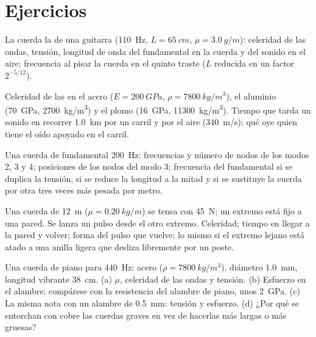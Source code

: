 \section{Ejercicios}

\begin{exercise}[$\star$]\label{exo:b2:waves-on-strings:1}
La cuerda la de una guitarra (\qty{110}{Hz}, $L = \qty{65}{cm}$, $\mu = \qty{3.0}{g/m}$):
celeridad de las ondas, tensión, longitud de onda del fundamental en la
cuerda y del sonido en el aire; frecuencia al pisar la cuerda en el quinto
traste ($L$ reducida en un factor $2^{-5/12}$).
\end{exercise}

\begin{exercise}[$\star$]\label{exo:b2:waves-on-strings:2}
Celeridad de las  en el acero ($E = \qty{200}{GPa}$, $\rho =
\qty{7800}{kg/m^3}$), el aluminio (\qty{70}{GPa}, \qty{2700}{kg/m^3}) y el plomo
(\qty{16}{GPa}, \qty{11300}{kg/m^3}). Tiempo que tarda un sonido en recorrer \qty{1.0}{km}
por un carril y por el aire (\qty{340}{m/s}); qué oye quien tiene el oído
apoyado en el carril.
\end{exercise}

\begin{exercise}[$\star$]\label{exo:b2:waves-on-strings:3}
Una cuerda de fundamental \qty{200}{Hz}: frecuencias y número de nodos de
los modos 2, 3 y 4; posiciones de los nodos del modo 3; frecuencia del
fundamental si se duplica la tensión, si se reduce la longitud a la mitad
y si se sustituye la cuerda por otra tres veces más pesada por metro.
\end{exercise}

\begin{exercise}[$\star$]\label{exo:b2:waves-on-strings:4}
Una cuerda de \qty{12}{m} ($\mu = \qty{0.20}{kg/m}$) se tensa con \qty{45}{N};
un extremo está fijo a una pared. Se lanza un pulso desde el otro extremo.
Celeridad; tiempo en llegar a la pared y volver; forma del pulso que
vuelve; lo mismo si el extremo lejano está atado a una anilla ligera que
desliza libremente por un poste.
\end{exercise}

\begin{exercise}[$\star\star$]\label{exo:b2:waves-on-strings:5}
Una cuerda de piano para \qty{440}{Hz}: acero ($\rho = \qty{7800}{kg/m^3}$),
diámetro \qty{1.0}{mm}, longitud vibrante \qty{38}{cm}. (a) $\mu$, celeridad
de las ondas y tensión. (b) Esfuerzo en el alambre; compárese con la
resistencia del alambre de piano, unos \qty{2}{GPa}. (c) La misma nota con un alambre de \qty{0.5}{mm}: tensión
y esfuerzo. (d) ¿Por qué se entorchan con cobre las cuerdas graves en vez
de hacerlas más largas o más gruesas?
\end{exercise}

